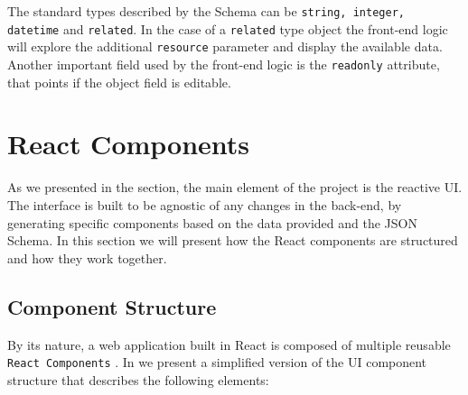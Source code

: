 The standard types described by the Schema can be \texttt{string, integer, datetime} and \texttt{related}. In the case of a \texttt{related} type object the front-end logic will explore the additional \texttt{resource} parameter and display the available data. Another important field used by the front-end logic is the \texttt{readonly} attribute, that points if the object field is editable.	

\section{React Components}
\label{sec:react-components}

As we presented in the  section, the main element of the project is the reactive UI. The interface is built to be agnostic of any changes in the back-end, by generating specific components based on the data provided and the JSON Schema. In this section we will present how the React components are structured and how they work together.

\subsection{Component Structure}
\label{sub-sec:component-structure}

By its nature, a web application built in React is composed of multiple reusable \texttt{React Components} \cite{book3}. In  we present a simplified version of the UI component structure that describes the following elements:



